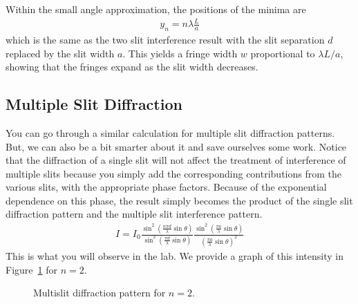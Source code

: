\noindent Within the small angle approximation, the positions of the minima 
are 
\begin{eqnarray*}
y_n = n \lambda \frac{L}{a}
\end{eqnarray*}
which is the same as the two slit interference result with the slit separation
$d$ replaced by the slit width $a$. This yields a fringe width $w$ proportional
to $\lambda L/a$, showing that the fringes expand as the slit width decreases. 
\suppressfloats

\subsection{Multiple Slit Diffraction}
\label{sec:diff:multislit}

You can go through a similar calculation for multiple slit diffraction 
patterns. But, we can also be a bit smarter about it and save ourselves some 
work. Notice that the diffraction of a single slit will not affect the 
treatment of interference of multiple slits because you simply add the 
corresponding contributions from the various slits, with the appropriate phase
factors. Because of the exponential dependence on this phase, the result simply
becomes the product of the single slit diffraction pattern and the multiple 
slit interference pattern. 
\begin{eqnarray}
I = I_0 \frac{\sin^2 \left(\frac{n\pi d}{\lambda} \sin \theta \right)}{
\sin^2 \left(\frac{\pi d}{\lambda} \sin \theta\right)}
        \frac{\sin^2 \left( \frac{\pi a}{\lambda} \sin \theta\right)}{
        \left( \frac{\pi a}{\lambda} \sin \theta  \right)^2}
    \label{eq:diff:multislit diffraction intensity}
\end{eqnarray}
This is what you will observe in the lab. We provide a graph of this intensity 
in Figure~\ref{fig:diff:multislit diffraction} for $n=2$.
\begin{figure}
\centerline{\epsfysize=8cm }
\caption{Multislit diffraction pattern for $n=2$.}
\label{fig:diff:multislit diffraction}
\end{figure}

